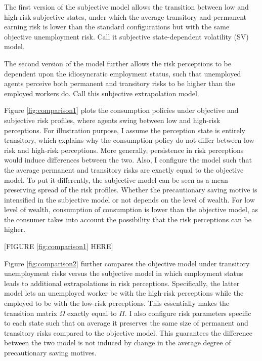 The first version of the subjective model allows the transition between low and high risk subjective states, under which the average transitory and permanent earning risk is lower than the standard configurations but with the same objective unemployment risk. Call it subjective state-dependent volatility (SV) model. 

The second version of the model further allows the risk perceptions to be dependent upon the idiosyncratic employment status, such that unemployed agents perceive both permanent and transitory risks to be higher than the employed workers do. Call this subjective extrapolation model. 

Figure \ref{fig:comparison1} plots the consumption policies under objective and subjective risk profiles, where agents swing between low and high-risk perceptions. For illustration purpose, I assume the perception state is entirely transitory, which explains why the consumption policy do not differ between low-risk and high-risk perceptions. More generally,  persistence in risk perceptions would induce differences between the two. Also, I configure the model such that the average permanent and transitory risks are exactly equal to the objective model. To put it differently, the subjective model can be seen as a mean-preserving spread of the risk profiles. Whether the precautionary saving motive is intensified in the subjective model or not depends on the level of wealth. For low level of wealth, consumption of consumption is lower than the objective model, as the consumer takes into account the possibility that the risk perceptions can be higher.


\begin{center}
[FIGURE \ref{fig:comparison1} HERE]
\end{center}

Figure \ref{fig:comparison2} further compares the objective model under transitory unemployment risks versus the subjective model in which employment status leads to additional extrapolations in risk perceptions. Specifically, the latter model lets an unemployed worker be with the high-risk perceptions while the employed to be with the low-risk perceptions. This essentially makes the transition matrix $\Omega$ exactly equal to $\Pi$. I also configure risk parameters specific to each state such that on average it preserves the same size of permanent and transitory risks compared to the objective model. This guarantees the difference between the two model is not induced by change in the average degree of precautionary saving motives. 

